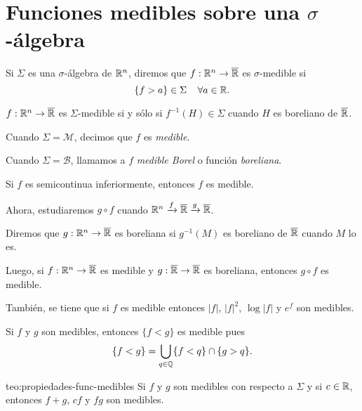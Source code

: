 \section{Funciones medibles sobre una $\sigma$-\'algebra}

\begin{definicion}{}
Si $\Sigma$ es una $\sigma$-\'algebra de $\mathbb{R}^n$, diremos que $f:\mathbb{R}^n\to \overline{\mathbb{R}}$ es $\sigma$-medible si 
\[\{f>a\} \in \Sigma\;\;\;\;\forall a \in \mathbb{R}.\]
\end{definicion}

\begin{proposicion}{}
$f:\mathbb{R}^n \to \overline{\mathbb{R}}$ es $\Sigma$-medible si y s\'olo si
$f^{-1}(H)\in \Sigma$ cuando $H$ es boreliano de $\overline{\mathbb{R}}$.
\end{proposicion}

Cuando $\Sigma=\mathscr{M}$, decimos que $f$ es \emph{medible}.

Cuando $\Sigma=\mathscr{B}$, llamamos a $f$ \emph{medible Borel} 
o funci\'on \emph{boreliana}.

\begin{ejercicio}{}
Si $f$ es semicontinua inferiormente, entonces $f$ es medible. 
\end{ejercicio}

Ahora, estudiaremos $g\circ f$ cuando 
$\mathbb{R}^n \xrightarrow{f}\overline{\mathbb{R}} \xrightarrow {g} \overline{\mathbb{R}}$.

\begin{definicion}{}
Diremos que $g: \mathbb{R}^n \to \overline{\mathbb{R}}$ es boreliana si $g^{-1}(M)$ es boreliano de $\overline{\mathbb{R}}$ cuando $M$ lo es.
\end{definicion}

Luego, si $f:\mathbb{R}^n \to \overline{\mathbb{R}}$ es medible y $g:\overline{\mathbb{R}} \to \overline{\mathbb{R}}$ es boreliana, entonces $g\circ f$ es medible.

Tambi\'en, se tiene que si $f$ es medible entonces $|f|$, $|f|^2$, $\log|f|$ y $e^f$ son medibles. 

Si $f$ y $g$ son medibles, entonces $\{f<g\}$ es medible pues
\[
\{f<g\}=\bigcup\limits_{q \in \mathbb{Q}} \{ f<q\} \cap \{ g>q\}.
\]
\begin{teorema}{teo:propiedades-func-medibles}
Si $f$ y $g$ son medibles con respecto a $\Sigma$ y si $c\in \mathbb{R}$, entonces
$f+g$, $cf$ y $fg$ son medibles.
\end{teorema}

